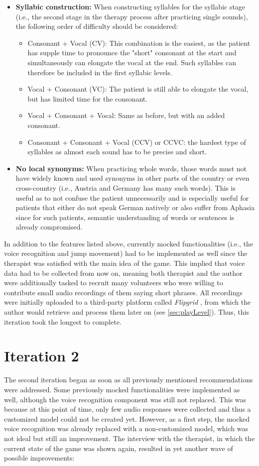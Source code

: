 \documentclass[draft,final]{vutinfth} %
\begin{document}
\begin{itemize}
\item \textbf{Syllabic construction:} When constructing syllables for the syllabic stage (i.e., the second stage in the therapy process after practicing single sounds), the following order of difficulty should be considered:
\begin{itemize}
\item Consonant + Vocal (CV): This combination is the easiest, as the patient has supple time to pronounce the "short" consonant at the start and simultaneously can elongate the vocal at the end. Such syllables can therefore be included in the first syllabic levels.
\item Vocal + Consonant (VC): The patient is still able to elongate the vocal, but has limited time for the consonant.
\item Vocal + Consonant + Vocal: Same as before, but with an added consonant.
\item Consonant + Consonant + Vocal (CCV) or CCVC: the hardest type of syllables as almost each sound has to be precise and short.
\end{itemize}
\item \textbf{No local synonyms:} When practicing whole words, those words must not have widely known and used synonyms in other parts of the country or even cross-country (i.e., Austria and Germany has many such words). This is useful as to not confuse the patient unnecessarily and is especially useful for patients that either do not speak German natively or also suffer from Aphasia since for such patients, semantic understanding of words or sentences is already compromised.
\end{itemize}
In addition to the features listed above, currently mocked functionalities (i.e., the voice recognition and jump movement) had to be implemented as well since the therapist was satisfied with the main idea of the game. This implied that voice data had to be collected from now on, meaning both therapist and the author were additionally tasked to recruit many volunteers who were willing to contribute small audio recordings of them saying short phrases. All recordings were initially uploaded to a third-party platform called \emph{Flipgrid} \cite{Flip}, from which the author would retrieve and process them later on (see \ref{sec:playLevel}). Thus, this iteration took the longest to complete.
\section{Iteration 2}
The second iteration began as soon as all previously mentioned recommendations were addressed. Some previously mocked functionalities were implemented as well, although the voice recognition component was still not replaced. This was because at this point of time, only few audio responses were collected and thus a customized model could not be created yet. However, as a first step, the mocked voice recognition was already replaced with a non-customized model, which was not ideal but still an improvement. The interview with the therapist, in which the current state of the game was shown again, resulted in yet another wave of possible improvements:
\end{document}
